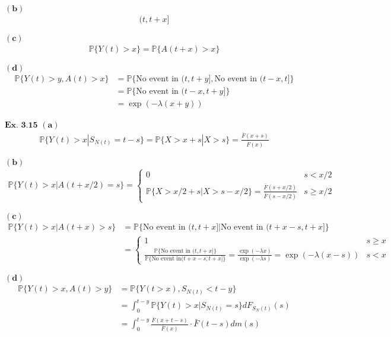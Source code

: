 \documentclass{article}
\begin{document}
$\mathbf{(b)}$
\begin{align*}
(t,t+x]
\end{align*}

$\mathbf{(c)}$
\begin{align*}
\mathbb{P}\{Y(t)>x\} = \mathbb{P}\{A(t+x)>x\}
\end{align*}

$\mathbf{(d)}$
\begin{align*}
\mathbb{P}\{Y(t)>y, A(t)>x\} &= \mathbb{P}\{\text{No event in }(t,t+y], \text{No event in }(t-x,t]\}\\
&= \mathbb{P}\{\text{No event in }(t-x,t+y]\}\\
&= \exp(-\lambda (x+y))
\end{align*}

\vspace{0.2in}
${\textbf{Ex. 3.15}}$
$\mathbf{(a)}$
\begin{align*}
\mathbb{P}\{Y(t)>x|S_{N(t)}=t-s\} = \mathbb{P}\{X>x+s|X>s\} = \frac{\bar{F}(x+s)}{\bar{F}(x)}
\end{align*}

$\mathbf{(b)}$
\begin{align*}
\mathbb{P}\{Y(t)>x|A(t+x/2) = s\} = \left\{\begin{matrix}0&s < x/2\\\mathbb{P}\{X>x/2+s|X>s-x/2\} = \frac{\bar{F}(s+x/2)}{\bar{F}(s-x/2)}&s\geq x/2\end{matrix}\right.
\end{align*}

$\mathbf{(c)}$
\begin{align*}
\mathbb{P}\{Y(t)>x|A(t+x)>s\} &= \mathbb{P}\{\text{No event in } (t,t+x]|\text{No event in } (t+x-s,t+x]\}\\
&= \left\{\begin{matrix}1&s\geq x\\\frac{\mathbb{P}\{\text{No event in }(t,t+x]\}}{\mathbb{P}\{\text{No event in}(t+x-s,t+x]\}} = \frac{\exp(-\lambda x)}{\exp(-\lambda s)} = \exp(-\lambda (x-s))&s<x\end{matrix}\right.
\end{align*}

$\mathbf{(d)}$
\begin{align*}
\mathbb{P}\{Y(t)>x, A(t)>y\} &= \mathbb{P}\{Y(t>x),S_{N(t)}<t-y\}\\
&= \int_{0}^{t-y}\mathbb{P}\{Y(t)>x|S_{N(t)}=s\}dF_{S_N(t)}(s)\\
&= \int_{0}^{t-y}\frac{\bar{F}(x+t-s)}{\bar{F}(x)} \cdot \bar{F}(t-s)dm(s)
\end{align*}
\end{document}
